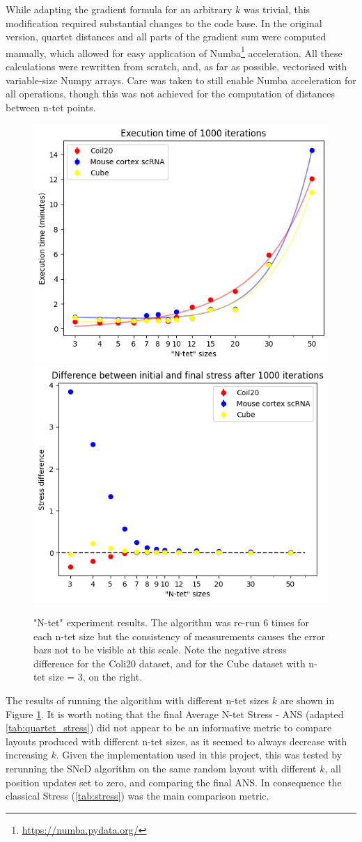 \documentclass{l4proj}
\begin{document}
While adapting the gradient formula for an arbitrary $k$ was trivial, this modification required substantial changes to the code base. In the original version, quartet distances and all parts of the gradient sum were computed manually, which allowed for easy application of Numba\footnote{ \url{https://numba.pydata.org/}} acceleration. All these calculations were rewritten from scratch, and, as far as possible, vectorised with variable-size Numpy arrays. Care was taken to still enable Numba acceleration for all operations, though this was not achieved for the computation of distances between n-tet points. 

\begin{figure}
    \includegraphics[width = 0.45\linewidth]{images/n-tet layouts/summary/time.png}
    \includegraphics[width = 0.45\linewidth]{images/n-tet layouts/summary/stress.png}

    \caption{"N-tet" experiment results. The algorithm was re-run 6 times for each n-tet size but the consistency of measurements causes the error bars  not to be visible at this scale. Note the negative stress difference for the Coli20 dataset, and for the Cube dataset with n-tet size = 3, on the right.}
    \label{fig:ntet_summmary}
\end{figure}

The results of running the algorithm with different n-tet sizes $k$ are shown in Figure \ref{fig:ntet_summmary}. It is worth noting that the final Average N-tet Stress - ANS (adapted \ref{tab:quartet_stress}) did not appear to be an informative metric to compare layouts produced with different n-tet sizes, as it seemed to always decrease with increasing $k$. Given the implementation used in this project, this was tested by rerunning the SNeD algorithm on the same random layout with different $k$, all position updates set to zero, and comparing the final ANS. In consequence the classical Stress (\ref{tab:stress}) was the main comparison metric. 
\end{document}
